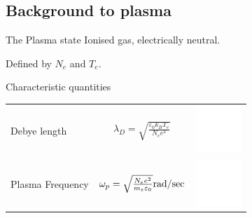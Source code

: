 \documentclass[dvipsnames]{beamer}
\begin{document}
\subsection{Background to plasma}
\begin{frame}{The Plasma state}
Ionised gas, electrically neutral.

Defined by $N_e$ and $T_e$.

Characteristic quantities
  \begin{tabular}{l c r}
  Debye length & $\lambda_D=\sqrt{\frac{\varepsilon_0 k_B T_e}{N_e e^2}}$ &  \includegraphics[height=50pt]{figures/theory/white_background.png}\\ 
  Plasma Frequency & $ \omega_p=\sqrt{\frac{N_e e^2}{m_e \varepsilon_0}}\si[per-mode=fraction]{\radian\per\sec} $ & \includegraphics[height=50pt]{figures/theory/white_background.png}\\
  \end{tabular}
\end{frame}
\end{document}

